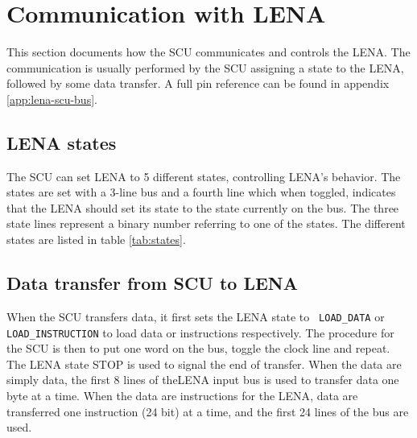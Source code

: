 \section{Communication with LENA}
\label{sec:SCU-LENA-communication}

This section documents how the \ac{SCU} communicates and controls the
\ac{LENA}. The communication is usually performed by the \ac{SCU} assigning a
state to the \ac{LENA}, followed by some data transfer. A full pin reference can
be found in appendix \ref{app:lena-scu-bus}.

\subsection{LENA states}

The \ac{SCU} can set \ac{LENA} to 5 different states, controlling \ac{LENA}'s
behavior. The states are set with a 3-line bus and a fourth line which when
toggled, indicates that the \ac{LENA} should set its state to the state
currently on the bus. The three state lines represent a binary number referring
to one of the states. The different states are listed in table \ref{tab:states}.



\subsection{Data transfer from SCU to LENA}
When the \ac{SCU} transfers data, it first sets the \ac{LENA} state to {\tt
  LOAD\_DATA} or {\tt LOAD\_INSTRUCTION} to load data or instructions
respectively. The procedure for the \ac{SCU} is then to put one word on the bus,
toggle the clock line and repeat. The \ac{LENA} state STOP is used to signal the
end of transfer. When the data are simply data, the first 8 lines of
the\ac{LENA} input bus is used to transfer data one byte at a time. When the
data are instructions for the \ac{LENA}, data are transferred one instruction (24
bit) at a time, and the first 24 lines of the bus are used.


